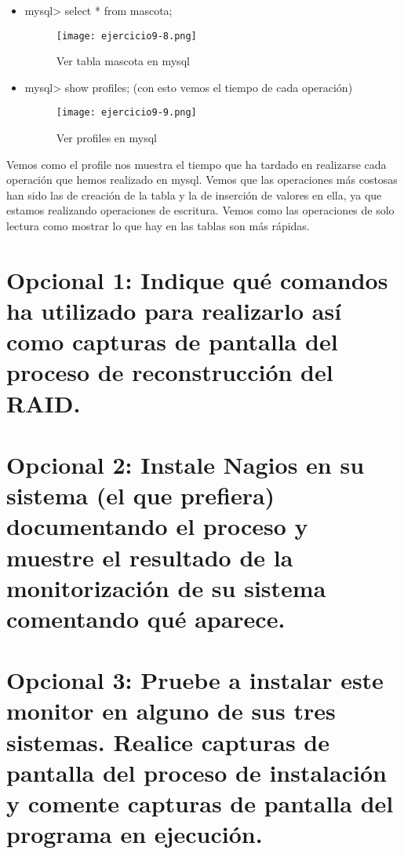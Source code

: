 \begin{itemize}
		\item mysql> select * from mascota;
			\begin{figure}[H] 
				\centering
				\texttt{[image: ejercicio9-8.png]} 
				\label{figura2} 			
				\caption{Ver tabla mascota en mysql}
			\end{figure}
		\item mysql> show profiles;  (con esto vemos el tiempo de cada operación)
			\begin{figure}[H] 
				\centering
				\texttt{[image: ejercicio9-9.png]} 
				\label{figura2} 			
				\caption{Ver profiles en mysql}
			\end{figure}
	\end{itemize}
	
	Vemos como el profile nos muestra el tiempo que ha tardado en realizarse cada operación que hemos realizado en mysql. Vemos que las operaciones más costosas han sido las de creación de la tabla y la de inserción de valores en ella, ya que estamos realizando operaciones de escritura. Vemos como las operaciones de solo lectura como mostrar lo que hay en las tablas son más rápidas.
	\section{Opcional 1: Indique qué comandos ha utilizado para realizarlo así como capturas de pantalla del proceso de reconstrucción del RAID.}
	

	\section{Opcional 2: Instale Nagios en su sistema (el que prefiera) documentando el proceso y muestre el resultado de la monitorización de su sistema comentando qué aparece.}
	

	\section{Opcional 3: Pruebe a instalar este monitor en alguno de sus tres sistemas. Realice capturas de pantalla del proceso de instalación y comente capturas de pantalla del programa en ejecución.}
	
